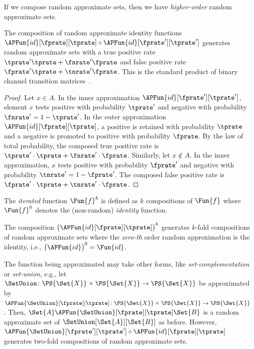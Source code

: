 If we compose random approximate sets, then we have \emph{higher-order} random approximate sets.
\begin{theorem}
\label{thm:composition_rates}
	The composition of random approximate identity functions $\APFun{id}[\fprate][\tprate] \circ \APFun{id}[\fprate'][\tprate']$ generates random approximate sets with a true positive rate $\tprate' \tprate + \fnrate' \fprate$ and false positive rate $\fprate' \tprate + \tnrate' \fprate$.
	This is the standard product of binary channel transition matrices~\cite{coverThomas}.
\end{theorem}
\begin{proof}
	Let $x \in A$. In the inner approximation $\APFun{id}[\fprate'][\tprate']$, element $x$ tests positive with probability $\tprate'$ and negative with probability $\fnrate' = 1 - \tprate'$.
	In the outer approximation $\APFun{id}[\fprate][\tprate]$, a positive is retained with probability $\tprate$ and a negative is promoted to positive with probability $\fprate$.
	By the law of total probability, the composed true positive rate is
	$\tprate' \cdot \tprate + \fnrate' \cdot \fprate$.
	Similarly, let $x \notin A$. In the inner approximation, $x$ tests positive with probability $\fprate'$ and negative with probability $\tnrate' = 1 - \fprate'$.
	The composed false positive rate is
	$\fprate' \cdot \tprate + \tnrate' \cdot \fprate$.
\end{proof}

\begin{definition}
	The \emph{iterated} function $\Fun{f}^k$ is defined as $k$ compositions of $\Fun{f}$ where $\Fun{f}^0$ denotes the (non-random) \emph{identity} function.
\end{definition}
The composition $\left(\APFun{id}[\fprate][\tprate]\right)^k$ generates $k$-fold compositions of random approximate sets where the \emph{zero-th} order random approximation is the identity, i.e., $\left(\APFun{id}\right)^0 = \Fun{id}$.

The function being approximated may take other forms, like \emph{set-complementation} or \emph{set-union}, e.g.,
let $\SetUnion \colon \PS{\Set{X}} \times \PS{\Set{X}} \to \PS{\Set{X}}$ be approximated by $\APFun{\SetUnion}[\fprate][\tprate] \colon \PS{\Set{X}} \times \PS{\Set{X}} \to \PS{\Set{X}}$.
Then, $\Set{A} \APFun{\SetUnion}[\fprate][\tprate] \Set{B}$ is a random approximate set of $\SetUnion[\Set{A}][\Set{B}]$ as before.
However, $\APFun{\SetUnion}[\fprate'][\tprate'] \circ \APFun{id}[\fprate][\tprate]$ generates two-fold compositions of random approximate sets.

